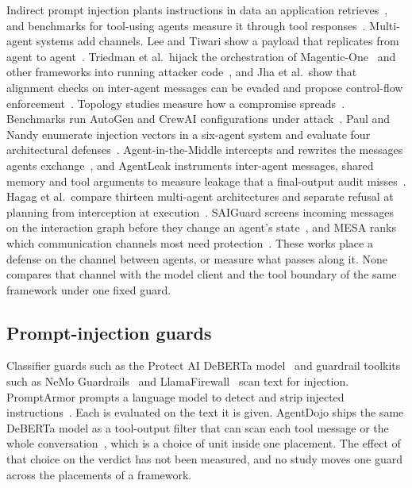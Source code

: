 \documentclass[conference]{IEEEtran}
\begin{document}
Indirect prompt injection plants instructions in data an application
retrieves~\cite{greshake2023indirect}, and benchmarks for tool-using agents
measure it through tool responses~\cite{zhan2024injecagent,debenedetti2024agentdojo,yi2023bipia,liu2023formalizing}.
Multi-agent systems add channels. Lee and Tiwari show a payload that
replicates from agent to agent~\cite{lee2024infection}. Triedman et al.\
hijack the orchestration of Magentic-One~\cite{fourney2024magentic} and
other frameworks into running attacker code~\cite{triedman2025mas}, and Jha
et al.\ show that alignment checks on inter-agent messages can be evaded and
propose control-flow enforcement~\cite{jha2025controlvalve}. Topology studies
measure how a compromise spreads~\cite{yu2024netsafe}. Benchmarks run AutoGen
and CrewAI configurations under attack~\cite{kavathekar2025tamas,nguyen2025pentest}.
Paul and Nandy enumerate injection vectors in a six-agent system and evaluate
four architectural defenses~\cite{paul2026beyond}. Agent-in-the-Middle
intercepts and rewrites the messages agents exchange~\cite{he2025aitm}, and
AgentLeak instruments inter-agent messages, shared memory and tool arguments
to measure leakage that a final-output audit misses~\cite{elyagoubi2026agentleak}.
Hagag et al.\ compare thirteen multi-agent architectures and separate
refusal at planning from interception at execution~\cite{hagag2026architecture}.
SAIGuard screens incoming messages on the interaction graph before they
change an agent's state~\cite{shi2026saiguard}, and MESA ranks which
communication channels most need protection~\cite{li2026mesa}. These works
place a defense on the channel between agents, or measure what passes along
it. None compares that channel with the model client and the tool boundary
of the same framework under one fixed guard.

\subsection{Prompt-injection guards}

Classifier guards such as the Protect AI DeBERTa model~\cite{protectai2024deberta,he2021debertav3}
and guardrail toolkits such as NeMo Guardrails~\cite{rebedea2023nemo} and
LlamaFirewall~\cite{chennabasappa2025llamafirewall} scan text for injection.
PromptArmor prompts a language model to detect and strip injected
instructions~\cite{shi2025promptarmor}. Each is evaluated on the text it is
given. AgentDojo ships the same DeBERTa model as a tool-output filter that can scan
each tool message or the whole conversation~\cite{debenedetti2024agentdojo},
which is a choice of unit inside one placement. The effect of that choice on
the verdict has not been measured, and no study moves one guard across the
placements of a framework.
\end{document}
